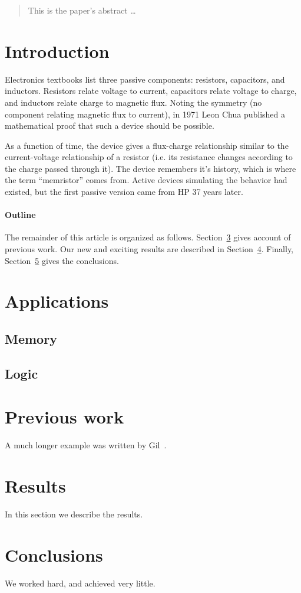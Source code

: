 \documentclass[12pt]{article}
\begin{document}
\maketitle

\begin{abstract}
This is the paper's abstract \ldots
\end{abstract}

\section{Introduction}
Electronics textbooks list three passive components: resistors, capacitors, and
inductors.  Resistors relate voltage to current, capacitors relate voltage to
charge, and inductors relate charge to magnetic flux.  Noting the symmetry (no
component relating magnetic flux to current), in 1971 Leon Chua published a
mathematical proof \cite{chua1971} that such a device should be possible.

As a function of time, the device gives a flux-charge relationship similar to
the current-voltage relationship of a resistor (i.e. its resistance changes
according to the charge passed through it).  The device remembers it's history,
which is where the term ``memristor'' comes from.  Active devices simulating
the behavior had existed, but the first passive version came from HP 37 years
later.\cite{strukov2008missing}

\paragraph{Outline}
The remainder of this article is organized as follows.
Section~\ref{previous work} gives account of previous work.
Our new and exciting results are described in Section~\ref{results}.
Finally, Section~\ref{conclusions} gives the conclusions.

\section{Applications}
\subsection{Memory}\label{memory}
\subsection{Logic}\label{logic}

\section{Previous work}\label{previous work}
A much longer \LaTeXe{} example was written by Gil~\cite{Gil:02}.

\section{Results}\label{results}
In this section we describe the results.

\section{Conclusions}\label{conclusions}
We worked hard, and achieved very little.



\end{document}
